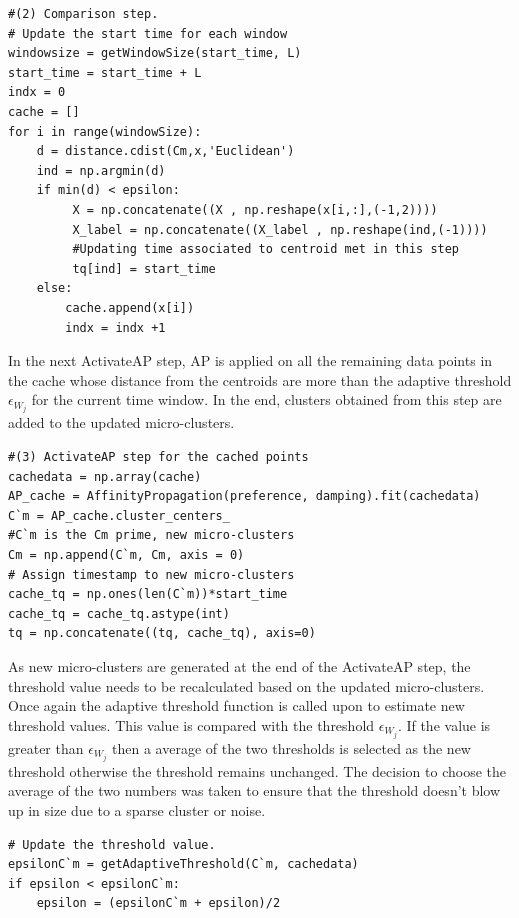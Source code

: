 \begin{lstlisting}
#(2) Comparison step.
# Update the start time for each window
windowsize = getWindowSize(start_time, L)
start_time = start_time + L
indx = 0
cache = []
for i in range(windowSize):
    d = distance.cdist(Cm,x,'Euclidean')
    ind = np.argmin(d)    
    if min(d) < epsilon:
         X = np.concatenate((X , np.reshape(x[i,:],(-1,2))))
         X_label = np.concatenate((X_label , np.reshape(ind,(-1))))
         #Updating time associated to centroid met in this step
         tq[ind] = start_time
    else:
        cache.append(x[i])       
        indx = indx +1
\end{lstlisting}


In the next ActivateAP step, AP is applied on all the remaining data points in the cache whose distance from the centroids are more than the adaptive threshold $\epsilon_{W_j}$ for the current time window. In the end, clusters obtained from this step are added to the updated micro-clusters.  


\begin{lstlisting}
#(3) ActivateAP step for the cached points
cachedata = np.array(cache)        
AP_cache = AffinityPropagation(preference, damping).fit(cachedata)
C`m = AP_cache.cluster_centers_
#C`m is the Cm prime, new micro-clusters
Cm = np.append(C`m, Cm, axis = 0)
# Assign timestamp to new micro-clusters
cache_tq = np.ones(len(C`m))*start_time
cache_tq = cache_tq.astype(int)
tq = np.concatenate((tq, cache_tq), axis=0)
\end{lstlisting}


As new micro-clusters are generated at the end of the ActivateAP step, the threshold value needs to be recalculated based on the updated micro-clusters. Once again the adaptive threshold function is called upon to estimate new threshold values. This value is compared with the threshold $\epsilon_{W_j}$. If the value is greater than $\epsilon_{W_j}$ then a average of the two thresholds is selected as the new threshold otherwise the threshold remains unchanged. The decision to choose the average of the two numbers was taken to ensure that the threshold doesn't blow up in size due to a sparse cluster or noise.
\begin{lstlisting}
# Update the threshold value.
epsilonC`m = getAdaptiveThreshold(C`m, cachedata)
if epsilon < epsilonC`m:
    epsilon = (epsilonC`m + epsilon)/2  
\end{lstlisting}


